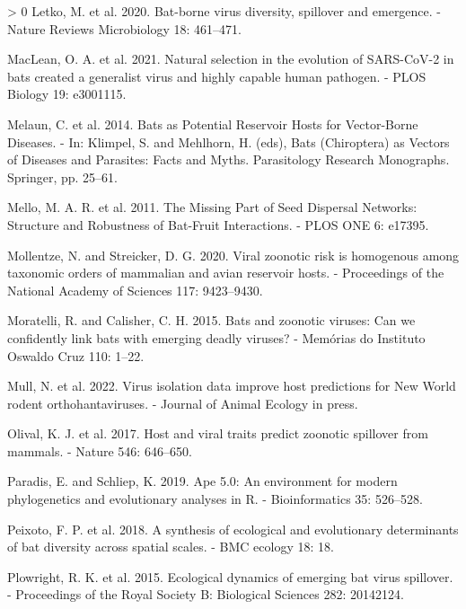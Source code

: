 \documentclass[11pt]{article}
\newlength{\cslhangindent}
\newenvironment{CSLReferences}[3] %
 {%
  \setlength{\parindent}{0pt}
  \ifodd #1 \everypar{\setlength{\hangindent}{\cslhangindent}}\ignorespaces\fi
  \ifnum #2 > 0
  \setlength{\parskip}{#2\baselineskip}
  \fi
 }%
 {}
\begin{document}
\begin{CSLReferences}{1}{0}
\leavevmode\hypertarget{ref-Letko2020BatVir}{}%
Letko, M. et al. 2020. Bat-borne virus diversity, spillover and
emergence. - Nature Reviews Microbiology 18: 461--471.

\leavevmode\hypertarget{ref-MacLean2021NatSel}{}%
MacLean, O. A. et al. 2021. Natural selection in the evolution of
SARS-CoV-2 in bats created a generalist virus and highly capable human
pathogen. - PLOS Biology 19: e3001115.

\leavevmode\hypertarget{ref-Melaun2014BatPot}{}%
Melaun, C. et al. 2014. Bats as Potential Reservoir Hosts for
Vector-Borne Diseases. - In: Klimpel, S. and Mehlhorn, H. (eds), Bats
(Chiroptera) as Vectors of Diseases and Parasites: Facts and Myths.
Parasitology Research Monographs. Springer, pp. 25--61.

\leavevmode\hypertarget{ref-Mello2011MisPar}{}%
Mello, M. A. R. et al. 2011. The Missing Part of Seed Dispersal
Networks: Structure and Robustness of Bat-Fruit Interactions. - PLOS ONE
6: e17395.

\leavevmode\hypertarget{ref-Mollentze2020VirZoo}{}%
Mollentze, N. and Streicker, D. G. 2020. Viral zoonotic risk is
homogenous among taxonomic orders of mammalian and avian reservoir
hosts. - Proceedings of the National Academy of Sciences 117:
9423--9430.

\leavevmode\hypertarget{ref-Moratelli2015BatZoo}{}%
Moratelli, R. and Calisher, C. H. 2015. Bats and zoonotic viruses: Can
we confidently link bats with emerging deadly viruses? - Memórias do
Instituto Oswaldo Cruz 110: 1--22.

\leavevmode\hypertarget{ref-Mull2022VirIso}{}%
Mull, N. et al. 2022. Virus isolation data improve host predictions for
New World rodent orthohantaviruses. - Journal of Animal Ecology in
press.

\leavevmode\hypertarget{ref-Olival2017HosVir}{}%
Olival, K. J. et al. 2017. Host and viral traits predict zoonotic
spillover from mammals. - Nature 546: 646--650.

\leavevmode\hypertarget{ref-Paradis2019ApeEnv}{}%
Paradis, E. and Schliep, K. 2019. Ape 5.0: An environment for modern
phylogenetics and evolutionary analyses in R. - Bioinformatics 35:
526--528.

\leavevmode\hypertarget{ref-Peixoto2018SynEco}{}%
Peixoto, F. P. et al. 2018. A synthesis of ecological and evolutionary
determinants of bat diversity across spatial scales. - BMC ecology 18:
18.

\leavevmode\hypertarget{ref-Plowright2015EcoDyn}{}%
Plowright, R. K. et al. 2015. Ecological dynamics of emerging bat virus
spillover. - Proceedings of the Royal Society B: Biological Sciences
282: 20142124.


\end{CSLReferences}
\end{document}
